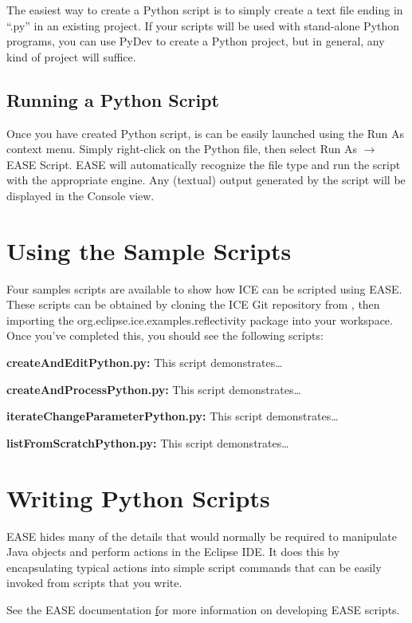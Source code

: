 \documentclass{article}
\begin{document}
The easiest way to create a Python script is to simply create a text file ending
in ``.py'' in an existing project. If your scripts will be used with stand-alone Python
programs, you can use PyDev to create a Python project, but in general, any kind
of project will suffice.

\subsection{Running a Python Script}

Once you have created Python script, is can be easily launched using the Run As
context menu. Simply right-click on the Python file, then select Run As
$\rightarrow$ EASE Script. EASE will automatically recognize the file type and
run the script with the appropriate engine. Any (textual) output generated by
the script will be displayed in the Console view.

\section{Using the Sample Scripts}

Four samples scripts are available to show how ICE can be scripted using EASE.
These scripts can be obtained by cloning the ICE Git repository from
\href{https://github.com/eclipse/ice.git}, then importing the
org.eclipse.ice.examples.reflectivity package into your workspace. Once you've
completed this, you should see the following scripts:

\textbf{createAndEditPython.py:} This script demonstrates\ldots

\textbf{createAndProcessPython.py:} This script demonstrates\ldots

\textbf{iterateChangeParameterPython.py:} This script demonstrates\ldots

\textbf{listFromScratchPython.py:} This script demonstrates\ldots

\section{Writing Python Scripts}

EASE hides many of the details that would normally be required to manipulate
Java objects and perform actions in the Eclipse IDE. It does this by
encapsulating typical actions into simple script commands that can be easily
invoked from scripts that you write.

See the EASE documentation \href{http://eclipse.org/ease/documentation} for more information on developing EASE scripts.
\end{document}
